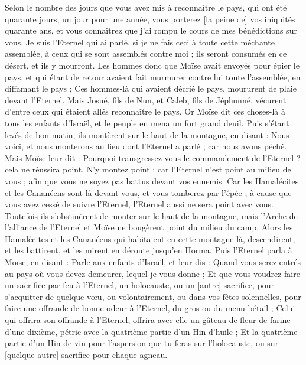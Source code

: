 \begin{multicols}{2}
Selon le nombre des jours que vous avez mis à reconnaître le pays, qui ont été quarante jours, un jour pour une année, vous porterez [la peine de] vos iniquités quarante ans, et vous connaîtrez que j'ai rompu le cours de mes bénédictions sur vous.
Je suis l'Eternel qui ai parlé, si je ne fais ceci à toute cette méchante assemblée, à ceux qui se sont assemblés contre moi ; ils seront consumés en ce désert, et ils y mourront.
Les hommes donc que Moïse avait envoyés pour épier le pays, et qui étant de retour avaient fait murmurer contre lui toute l'assemblée, en diffamant le pays ;
Ces hommes-là qui avaient décrié le pays, moururent de plaie devant l'Eternel.
Mais Josué, fils de Nun, et Caleb, fils de Jéphunné, vécurent d'entre ceux qui étaient allés reconnaître le pays.
Or Moïse dit ces choses-là à tous les enfants d'Israël, et le peuple en mena un fort grand deuil.
Puis s'étant levés de bon matin, ils montèrent sur le haut de la montagne, en disant : Nous voici, et nous monterons au lieu dont l'Eternel a parlé ; car nous avons péché.
Mais Moïse leur dit : Pourquoi transgressez-vous le commandement de l'Eternel ? cela ne réussira point.
N'y montez point ; car l'Eternel n'est point au milieu de vous ; afin que vous ne soyez pas battus devant vos ennemis.
Car les Hamalécites et les Cananéens sont là devant vous, et vous tomberez par l'épée ; à cause que vous avez cessé de suivre l'Eternel, l'Eternel aussi ne sera point avec vous.
Toutefois ils s'obstinèrent de monter sur le haut de la montagne, mais l'Arche de l'alliance de l'Eternel et Moïse ne bougèrent point du milieu du camp.
Alors les Hamalécites et les Cananéens qui habitaient en cette montagne-là, descendirent, et les battirent, et les mirent en déroute jusqu'en Horma.
\VerseOne{}Puis l'Eternel parla à Moïse, en disant :
Parle aux enfants d'Israël, et leur dis : Quand vous serez entrés au pays où vous devez demeurer, lequel je vous donne ;
Et que vous voudrez faire un sacrifice par feu à l'Eternel, un holocauste, ou un [autre] sacrifice, pour s'acquitter de quelque vœu, ou volontairement, ou dans vos fêtes solennelles, pour faire une offrande de bonne odeur à l'Eternel, du gros ou du menu bétail ;
Celui qui offrira son offrande à l'Eternel, offrira avec elle un gâteau de fleur de farine d'une dixième, pétrie avec la quatrième partie d'un Hin d'huile ;
Et la quatrième partie d'un Hin de vin pour l'aspersion que tu feras sur l'holocauste, ou sur [quelque autre] sacrifice pour chaque agneau.

\end{multicols}
